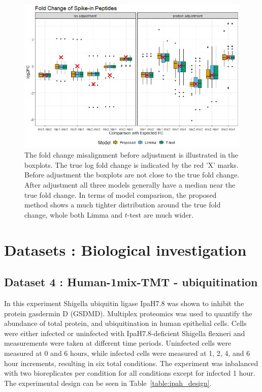 \documentclass{mcp}
\begin{document}
\begin{figure}[h!]
\centering
\includegraphics[width=.85\textwidth]{sim_new/spike_in_fc}
\caption{The fold change misalignment before adjustment is illustrated in the boxplots. The true log fold change is indicated by the red 'X' marks. Before adjustment the boxplots are not close to the true fold change. After adjustment all three models generally have a median near the true fold change. In terms of model comparison, the proposed method shows a much tighter distribution around the true fold change, whole both Limma and $t$-test are much wider. \label{fig:spike_fc}}
\end{figure}


\clearpage
\section{Datasets : Biological investigation}
\label{sec:bio_investigations}

\subsection{Dataset 4 : Human-1mix-TMT - ubiquitination}
\label{sec:ipah}

In this experiment Shigella ubiquitin ligase IpaH7.8 was shown to inhibit the protein gasdermin D (GSDMD). \cite{LUCHETTI2021} Multiplex proteomics was used to quantify the abundance of total protein, and ubiquitination in human epithelial cells. Cells were either infected or uninfected with IpaH7.8-deficient Shigella flexneri and measurements were taken at different time periods. Uninfected cells were measured at 0 and 6 hours, while infected cells were measured at 1, 2, 4, and 6 hour increments, resulting in six total conditions. The experiment was inbalanced with two bioreplicates per condition for all conditions except for infected 1 hour. The experimental design can be seen in Table~\ref{table:ipah_design}.
\end{document}
